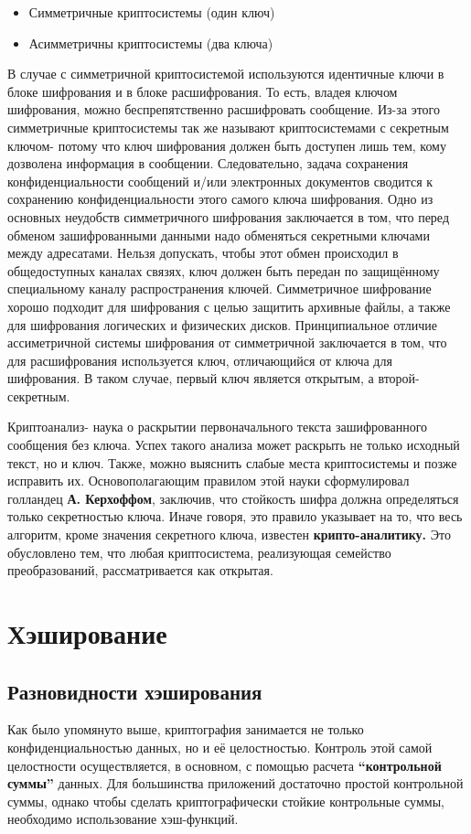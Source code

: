 \documentclass[a4paper,14pt]{report}
\begin{document}
\begin{itemize}
  \item Симметричные криптосистемы (один ключ)
  \item Асимметричны криптосистемы (два ключа)
  \end{itemize}

В случае с симметричной криптосистемой используются идентичные ключи в блоке шифрования и в блоке расшифрования. То есть, владея ключом шифрования, можно беспрепятственно расшифровать сообщение. Из-за этого симметричные криптосистемы так же называют криптосистемами с секретным ключом- потому что ключ шифрования должен быть доступен лишь тем, кому дозволена информация в сообщении. Следовательно, задача сохранения конфиденциальности сообщений и/или электронных документов сводится к сохранению конфиденциальности этого самого ключа шифрования.
Одно из основных неудобств симметричного шифрования заключается в том, что перед обменом зашифрованными данными надо обменяться секретными ключами между адресатами. Нельзя допускать, чтобы этот обмен происходил в общедоступных каналах связях, ключ должен быть передан по защищённому специальному каналу распространения ключей.
Симметричное шифрование хорошо подходит для шифрования с целью защитить архивные файлы, а также для шифрования логических и физических дисков.
Принципиальное отличие ассиметричной системы шифрования от симметричной заключается в том, что для расшифрования используется ключ, отличающийся от ключа для шифрования. В таком случае, первый ключ является открытым, а второй- секретным.

Криптоанализ- наука о раскрытии первоначального текста зашифрованного сообщения без ключа. Успех такого анализа может раскрыть не только исходный текст, но и ключ. Также, можно выяснить слабые места криптосистемы и позже исправить их.
Основополагающим правилом этой науки сформулировал голландец \textbf{А. Керхоффом}, заключив, что стойкость шифра должна определяться только секретностью ключа. Иначе говоря, это правило указывает на то, что весь алгоритм, кроме значения секретного ключа, известен \textbf{крипто-аналитику.} Это обусловлено тем, что любая криптосистема, реализующая семейство преобразований, рассматривается как открытая. 

\chapter{Хэширование}
\section{Разновидности хэширования}
Как было упомянуто выше, криптография занимается не только конфиденциальностью данных, но и её целостностью. Контроль этой самой целостности осуществляется, в основном, с помощью расчета \textbf{“контрольной суммы”} данных. Для большинства приложений достаточно простой контрольной суммы, однако чтобы сделать криптографически стойкие контрольные суммы, необходимо использование хэш-функций.
\end{document}
